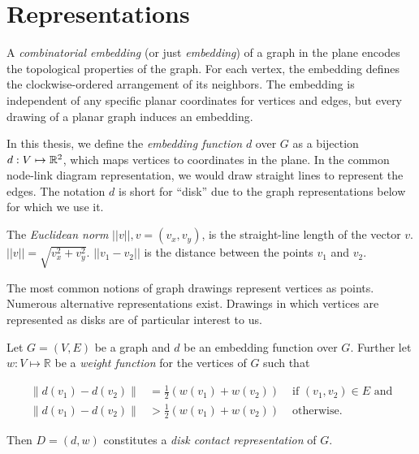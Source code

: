 \section{Representations}

A \emph{combinatorial embedding} (or just \emph{embedding}) of a graph in the plane encodes the topological properties of the graph. For each vertex, the embedding defines the clockwise-ordered arrangement of its neighbors. The embedding is independent of any specific planar coordinates for vertices and edges, but every drawing of a planar graph induces an embedding.

In this thesis, we define the \emph{embedding function} $d$ over $G$ as a bijection $d: V \mapsto \mathbb R^2$, which maps vertices to coordinates in the plane. In the common node-link diagram representation, we would draw straight lines to represent the edges. The notation $d$ is short for ``disk'' due to the graph representations below for which we use it.


The \emph{Euclidean norm} $||v||, v = (v_x, v_y)$, is the straight-line length of the vector $v$. $||v|| = \sqrt{v_x^2 + v_y^2}$. $||v_1 - v_2||$ is the distance between the points $v_1$ and $v_2$.

The most common notions of graph drawings represent vertices as points. Numerous alternative representations exist. Drawings in which vertices are represented as disks are of particular interest to us.

\begin{definition}
\label{def:ch2_DCR}
Let $G = (V, E)$ be a graph and $d$ be an embedding function over $G$. Further let $w: V \mapsto \mathbb R$ be a \emph{weight function} for the vertices of $G$ such that

\begin{align*}
\lVert d(v_1) - d(v_2) \rVert &= \frac12(w(v_1) + w(v_2)) &\text{ if } (v_1, v_2) \in E \text{ and} \\ \lVert d(v_1) - d(v_2) \rVert &> \frac12(w(v_1) + w(v_2)) &\text{ otherwise.}
\end{align*}

Then $D = (d, w)$ constitutes a \emph{disk contact representation} of $G$.
\end{definition}

